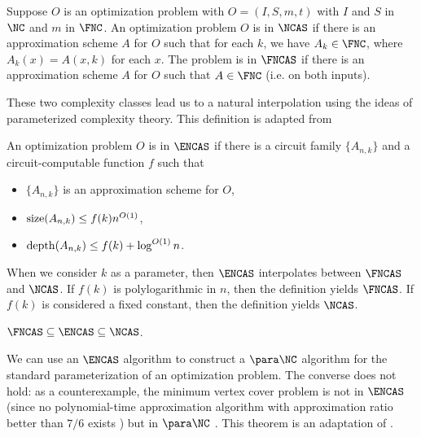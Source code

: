 \begin{definition}
  Suppose $O$ is an optimization problem with $O = (I, S, m, t)$ with $I$ and $S$ in $\NC$ and $m$ in $\FNC$.
  An optimization problem $O$ is in $\NCAS$ if there is an approximation scheme $A$ for $O$ such that for each $k$, we have $A_k \in \FNC$, where $A_k(x) = A(x, k)$ for each $x$.
  The problem is in $\FNCAS$ if there is an approximation scheme $A$ for $O$ such that $A \in \FNC$ (i.e. on both inputs).
\end{definition}

These two complexity classes lead us to a natural interpolation using the ideas of parameterized complexity theory.
This definition is adapted from \autocite[Definition~1.31]{fg06}

\begin{definition}[$\ENCAS$]
  An optimization problem $O$ is in $\ENCAS$ if there is a circuit family $\{A_{n, k}\}$ and a circuit-computable function $f$ such that
  \begin{itemize}
  \item $\{A_{n, k}\}$ is an approximation scheme for $O$,
  \item $\operatorname{size}(A_{n, k}) \leq f(k) n^{O(1)}$,
  \item $\operatorname{depth}(A_{n, k}) \leq f(k) + \log^{O(1)} n$.
  \end{itemize}
\end{definition}

When we consider $k$ as a parameter, then $\ENCAS$ interpolates between $\FNCAS$ and $\NCAS$.
If $f(k)$ is polylogarithmic in $n$, then the definition yields $\FNCAS$.
If $f(k)$ is considered a fixed constant, then the definition yields $\NCAS$.

\begin{proposition}\label{prop:encas}
  $\FNCAS \subseteq \ENCAS \subseteq \NCAS$.
\end{proposition}


We can use an $\ENCAS$ algorithm to construct a $\para \NC$ algorithm for the standard parameterization of an optimization problem.
The converse does not hold: as a counterexample, the minimum vertex cover problem is not in $\ENCAS$ (since no polynomial-time approximation algorithm with approximation ratio better than $7 / 6$ exists \autocite[Theorem~8.1]{hastad01}) but in $\para \NC$ \autocite[Theorem~4.5]{bst15}.
This theorem is an adaptation of \autocite[Theorem~1.32]{fg06}.


